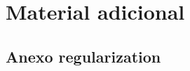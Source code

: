 \chapter{Material adicional}
\label{chap:adicional}

\section{Anexo regularization}
\label{sec:Anexo regularization}


